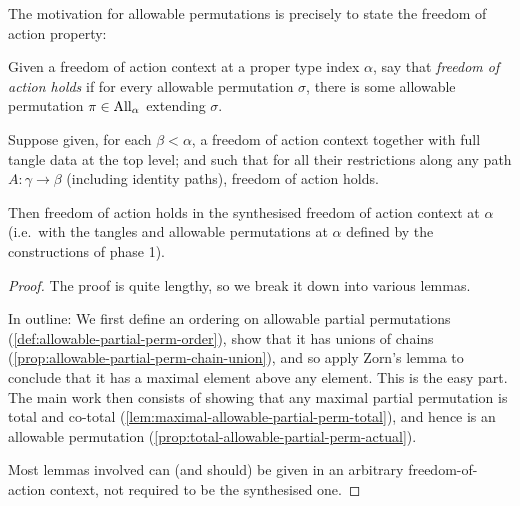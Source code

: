 The motivation for allowable permutations is precisely to state the freedom of action property:

\begin{definition}
  \label{def:foa-property}
  Given a freedom of action context at a proper type index $\alpha$, say that \emph{freedom of action holds} if for every allowable permutation $\sigma$, there is some allowable permutation $\pi \in \mathrm{All}_\alpha$ extending $\sigma$.
\end{definition}

\begin{theorem}
  \label{thm:foa-propagates}
  Suppose given, for each $\beta < \alpha$, a freedom of action context together with full tangle data at the top level; and such that for all their restrictions along any path $A : \gamma \to \beta$ (including identity paths), freedom of action holds.

  Then freedom of action holds in the synthesised freedom of action context at $\alpha$ (i.e.\ with the tangles and allowable permutations at $\alpha$ defined by the constructions of phase 1).
\end{theorem}

\begin{proof}
  The proof is quite lengthy, so we break it down into various lemmas.

  In outline: We first define an ordering on allowable partial permutations (\cref{def:allowable-partial-perm-order}), show that it has unions of chains (\cref{prop:allowable-partial-perm-chain-union}), and so apply Zorn’s lemma to conclude that it has a maximal element above any element.  This is the easy part.  The main work then consists of showing that any maximal partial permutation is total and co-total (\cref{lem:maximal-allowable-partial-perm-total}), and hence is an allowable permutation (\cref{prop:total-allowable-partial-perm-actual}).

  Most lemmas involved can (and should) be given in an arbitrary freedom-of-action context, not required to be the synthesised one.
\end{proof}

